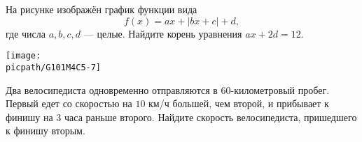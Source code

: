 \begin{exam}
\begin{listofex}
\begin{minipage}[t]{\picwidth}
		\end{minipage}
		\item
		\begin{minipage}[t]{\bodywidth}
			На рисунке изображён график функции вида \[ f(x)=ax+|bx+c|+d, \] где числа \(a, b, c, d\) --- целые. Найдите корень уравнения \(ax+2d=12\).
		\end{minipage}
		\hspace{0.02\linewidth}
		\begin{minipage}[t]{\picwidth}
			\texttt{[image: \\picpath/G101M4C5-7]}
		\end{minipage}
		\item Два велосипедиста одновременно отправляются в \( 60 \)-километровый пробег. Первый едет со скоростью на \( 10 \) км/ч большей, чем второй, и прибывает к финишу на \( 3 \) часа раньше второго. Найдите скорость велосипедиста, пришедшего к финишу вторым.
	\end{listofex}
\end{exam}
